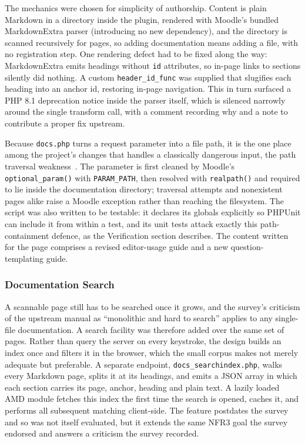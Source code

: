 The mechanics were chosen for simplicity of authorship. Content is plain Markdown in a directory inside the plugin, rendered with Moodle's bundled MarkdownExtra parser (introducing no new dependency), and the directory is scanned recursively for pages, so adding documentation means adding a file, with no registration step. One rendering defect had to be fixed along the way: MarkdownExtra emits headings without \texttt{id} attributes, so in-page links to sections silently did nothing. A custom \texttt{header\_id\_func} was supplied that slugifies each heading into an anchor id, restoring in-page navigation. This in turn surfaced a PHP 8.1 deprecation notice inside the parser itself, which is silenced narrowly around the single transform call, with a comment recording why and a note to contribute a proper fix upstream.

Because \texttt{docs.php} turns a request parameter into a file path, it is the one place among the project's changes that handles a classically dangerous input, the path traversal weakness~\cite{cwe22}. The parameter is first cleaned by Moodle's \texttt{optional\_param()} with \texttt{PARAM\_PATH}, then resolved with \texttt{realpath()} and required to lie inside the documentation directory; traversal attempts and nonexistent pages alike raise a Moodle exception rather than reaching the filesystem. The script was also written to be testable: it declares its globals explicitly so PHPUnit can include it from within a test, and its unit tests attack exactly this path-containment defence, as the Verification section describes. The content written for the page comprises a revised editor-usage guide and a new question-templating guide.

\subsubsection{Documentation Search}
A scannable page still has to be searched once it grows, and the survey's criticism of the upstream manual as ``monolithic and hard to search'' applies to any single-file documentation. A search facility was therefore added over the same set of pages. Rather than query the server on every keystroke, the design builds an index once and filters it in the browser, which the small corpus makes not merely adequate but preferable. A separate endpoint, \texttt{docs\_searchindex.php}, walks every Markdown page, splits it at its headings, and emits a JSON array in which each section carries its page, anchor, heading and plain text. A lazily loaded AMD module fetches this index the first time the search is opened, caches it, and performs all subsequent matching client-side. The feature postdates the survey and so was not itself evaluated, but it extends the same NFR3 goal the survey endorsed and answers a criticism the survey recorded.

